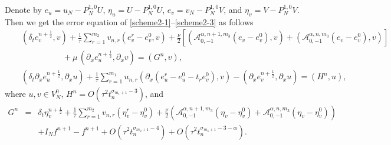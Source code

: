 \documentclass[10pt]{siamltex}
\newcommand{\px}[1][x]{\partial_{#1}}
\newcommand{\mfrac}[1][2]{\frac{1}{2}}
\begin{document}
Denote by $e_u=u_N-P_N^{1,0}U$, $\eta_u=U-P_N^{1,0}U$,
$e_v=v_N-P_N^{1,0}V$, and $\eta_v=V-P_N^{1,0}V$. Then we get the error equation of  \eqref{scheme2-1}--\eqref{scheme2-3}
as follows
\begin{eqnarray}
&&(\delta_te_v^{n+\mfrac},v)+\frac{1}{\tau}\sum_{r=1}^{m_2} v_{n,r}(e_v^r-e_v^0,v)
+\frac{\nu}{2}\left[\left(\mathcal{{A}}_{0,-1}^{\alpha,n+1,m_3}(e_v-e_v^0),v\right)
+\left(\mathcal{{A}}_{0,-1}^{\alpha,n,m_3}(e_v-e_v^0),v\right)\right]\nonumber\\
&&{\qquad\qquad\quad}+\mu\,(\px e_u^{n+\mfrac},\px v)=(G^n,v),\label{err-3}\\
&&(\delta_t\px[x]e_u^{n+\mfrac},\px[x]u)
+\frac{1}{\tau}\sum_{r=1}^{m_1} u_{n,r}(\px[x](e_u^r-e_u^0-t_re_v^0),v)
- (\px e_v^{n+\mfrac},\px u)=(H^n,u),\label{err-4}
\end{eqnarray}
where $u,v\in V_N^0$,  $H^n=O(\tau^2t_n^{\sigma_{m_1+1}-3})$,  and
\begin{eqnarray*}
G^n&=&\delta_t\eta_v^{n+\mfrac}
+\frac{1}{\tau}\sum_{r=1}^{m_2} v_{n,r}(\eta_v^r-\eta_v^0)+\frac{\nu}{2}
\left(\mathcal{{A}}_{0,-1}^{\alpha,n+1,m_3}(\eta_v-\eta_v^0)
+\mathcal{{A}}_{0,-1}^{\alpha,n,m_3}(\eta_v-\eta_v^0)\right)\\
&&+I_Nf^{n+1}-f^{n+1}+O(\tau^2t_n^{\sigma_{m_2+1}-4})+O(\tau^2t_n^{\sigma_{m_3+1}-3-\alpha}).
\end{eqnarray*}
\end{document}

